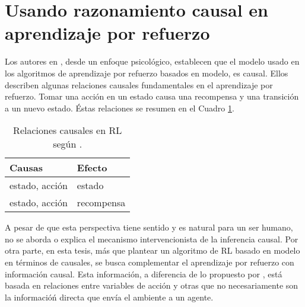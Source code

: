 

\section{Usando razonamiento causal en aprendizaje por refuerzo}


Los autores en \cite{Gershman2017}, desde un enfoque psicológico, establecen que el modelo usado en los algoritmos de aprendizaje por refuerzo basados en modelo,
es causal.
Ellos describen algunas relaciones causales fundamentales en el aprendizaje por refuerzo. Tomar una acción en un estado causa una recompensa y una transición a un nuevo estado.
Éstas relaciones se resumen en el Cuadro \ref{table:causal-relationships}. 

\begin{table}[h]
\centering
\caption{Relaciones causales en RL según \cite{Gershman2017}.}
\label{table:causal-relationships}
\begin{tabular}{@{}ll@{}}
\toprule
Causas         & Efecto     \\ \midrule
estado, acción & estado     \\
estado, acción & recompensa \\ \bottomrule
\end{tabular}
\end{table}

A pesar de que esta perspectiva tiene sentido y es natural para un ser humano, no se aborda o explica el mecanismo intervencionista de la inferencia causal. 
Por otra parte, en esta tesis, más que plantear un algoritmo de RL 
basado en modelo en términos de causales, se
busca complementar el aprendizaje por refuerzo con información causal.
Esta información, a diferencia de lo propuesto por \cite{Gershman2017}, está
basada en relaciones entre variables de acción y otras que no necesariamente son la informacióń directa que envía el ambiente a un agente.



